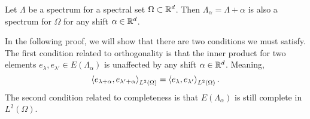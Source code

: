 \documentclass[../thesis.tex]{subfiles}
\begin{document}
%
%
%
\begin{lemma}\label{lem:spectrum_shift_is_spectrum}
    Let $\Lambda$ be a spectrum for a spectral set $\Omega \subset \mathbb{R}^d$. Then $\Lambda_\alpha = \Lambda + \alpha$ is also a spectrum for $\Omega$ for any shift $\alpha \in \mathbb{R}^d$.
\end{lemma}
In the following proof, we will show that there are two conditions we must satisfy. The first condition related to orthogonality is that the inner product for two elements $e_{\lambda},e_{\lambda'} \in E(\Lambda_\alpha)$ is unaffected by any shift $\alpha \in \mathbb{R}^d$. Meaning,
\begin{equation}
    \left \langle e_{\lambda+\alpha},e_{\lambda'+\alpha} \right \rangle_{L^2(\Omega)} = \left \langle e_{\lambda},e_{\lambda'} \right \rangle_{L^2(\Omega)}.
\end{equation}
The second condition related to completeness is that $E(\Lambda_\alpha)$ is still complete in $L^2(\Omega)$.
\end{document}
